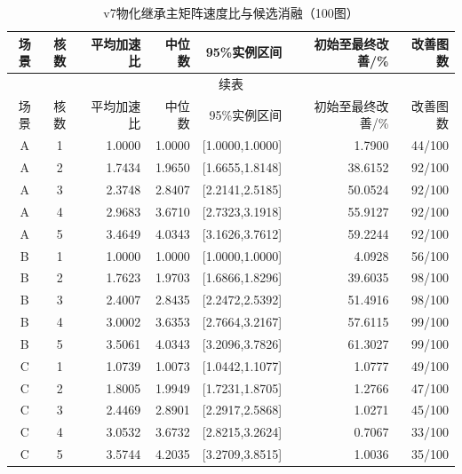 \begin{longtable}{ccrrrrr}
\caption{v7物化继承主矩阵速度比与候选消融（100图）}\label{tab:v7-summary}\\
\toprule
场景 & 核数 & 平均加速比 & 中位数 & 95\%实例区间 & 初始至最终改善/\% & 改善图数 \\
\midrule
\endfirsthead
\multicolumn{7}{c}{续表}\\
\toprule
场景 & 核数 & 平均加速比 & 中位数 & 95\%实例区间 & 初始至最终改善/\% & 改善图数 \\
\midrule
\endhead
\bottomrule
\endlastfoot
A & 1 & 1.0000 & 1.0000 & [1.0000,1.0000] & 1.7900 & 44/100 \\
A & 2 & 1.7434 & 1.9650 & [1.6655,1.8148] & 38.6152 & 92/100 \\
A & 3 & 2.3748 & 2.8407 & [2.2141,2.5185] & 50.0524 & 92/100 \\
A & 4 & 2.9683 & 3.6710 & [2.7323,3.1918] & 55.9127 & 92/100 \\
A & 5 & 3.4649 & 4.0343 & [3.1626,3.7612] & 59.2244 & 92/100 \\
B & 1 & 1.0000 & 1.0000 & [1.0000,1.0000] & 4.0928 & 56/100 \\
B & 2 & 1.7623 & 1.9703 & [1.6866,1.8296] & 39.6035 & 98/100 \\
B & 3 & 2.4007 & 2.8435 & [2.2472,2.5392] & 51.4916 & 98/100 \\
B & 4 & 3.0002 & 3.6353 & [2.7664,3.2167] & 57.6115 & 99/100 \\
B & 5 & 3.5061 & 4.0343 & [3.2096,3.7826] & 61.3027 & 99/100 \\
C & 1 & 1.0739 & 1.0073 & [1.0442,1.1077] & 1.0777 & 49/100 \\
C & 2 & 1.8005 & 1.9949 & [1.7231,1.8705] & 1.2766 & 47/100 \\
C & 3 & 2.4469 & 2.8901 & [2.2917,2.5868] & 1.0271 & 45/100 \\
C & 4 & 3.0532 & 3.6732 & [2.8215,3.2624] & 0.7067 & 33/100 \\
C & 5 & 3.5744 & 4.2035 & [3.2709,3.8515] & 1.0036 & 35/100 \\
\end{longtable}
